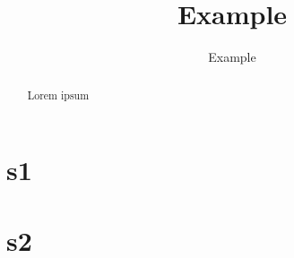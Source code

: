 \documentclass{article}
\title{Example}
\author{Example \\ \email{email@gmail.com}}
\begin{document}
\maketitle

\begin{abstract}
    Lorem ipsum
\end{abstract}

\section{s1}

\section{s2}


\begin{thebibliography}
    \endgroup{}
\end{thebibliography}
\end{document}
